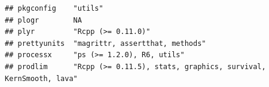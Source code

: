 \documentclass[]{article}
\begin{document}
\begin{verbatim}
## pkgconfig    "utils"                                                                                                                                                                                                                                                                                                                                                                                                                                                                               
## plogr        NA                                                                                                                                                                                                                                                                                                                                                                                                                                                                                    
## plyr         "Rcpp (>= 0.11.0)"                                                                                                                                                                                                                                                                                                                                                                                                                                                                    
## prettyunits  "magrittr, assertthat, methods"                                                                                                                                                                                                                                                                                                                                                                                                                                                       
## processx     "ps (>= 1.2.0), R6, utils"                                                                                                                                                                                                                                                                                                                                                                                                                                                            
## prodlim      "Rcpp (>= 0.11.5), stats, graphics, survival, KernSmooth, lava"                                                                                                                                                                                                                                                                                                                                                                                                                       

\end{verbatim}
\end{document}
